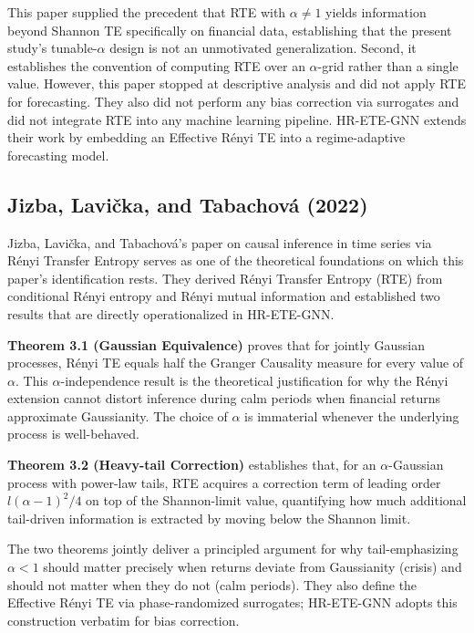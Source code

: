\documentclass[12pt,oneside]{report}
\begin{document}
This paper supplied the precedent that RTE with $\alpha \neq 1$ yields
information beyond Shannon TE specifically on financial data,
establishing that the present study's tunable-$\alpha$ design is not an
unmotivated generalization. Second, it establishes the convention of
computing RTE over an $\alpha$-grid rather than a single value. However,
this paper stopped at descriptive analysis and did not apply RTE for
forecasting. They also did not perform any bias correction via
surrogates and did not integrate RTE into any machine learning pipeline.
HR-ETE-GNN extends their work by embedding an Effective Rényi TE into a
regime-adaptive forecasting model.

\subsection{Jizba, Lavička, and Tabachová (2022)}

Jizba, Lavička, and Tabachová's \cite{jizba2022} paper on causal
inference in time series via Rényi Transfer Entropy serves as one of the
theoretical foundations on which this paper's identification rests. They
derived Rényi Transfer Entropy (RTE) from conditional Rényi entropy and
Rényi mutual information and established two results that are directly
operationalized in HR-ETE-GNN.

\textbf{Theorem 3.1 (Gaussian Equivalence)} proves that for jointly
Gaussian processes, Rényi TE equals half the Granger Causality measure
for every value of $\alpha$. This $\alpha$-independence result is the
theoretical justification for why the Rényi extension cannot distort
inference during calm periods when financial returns approximate
Gaussianity. The choice of $\alpha$ is immaterial whenever the
underlying process is well-behaved.

\textbf{Theorem 3.2 (Heavy-tail Correction)} establishes that, for an
$\alpha$-Gaussian process with power-law tails, RTE acquires a
correction term of leading order $l(\alpha - 1)^{2}/4$ on top of the
Shannon-limit value, quantifying how much additional tail-driven
information is extracted by moving below the Shannon limit.

The two theorems jointly deliver a principled argument for why
tail-emphasizing $\alpha < 1$ should matter precisely when returns
deviate from Gaussianity (crisis) and should not matter when they do not
(calm periods). They also define the Effective Rényi TE via
phase-randomized surrogates; HR-ETE-GNN adopts this construction
verbatim for bias correction.
\end{document}

